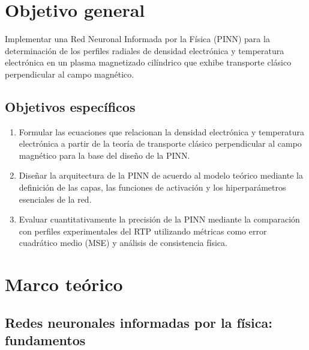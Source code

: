 \section{Objetivo general}
Implementar una Red Neuronal Informada por la Física (PINN) para la determinación de los perfiles radiales de densidad electrónica y temperatura electrónica en un plasma magnetizado cilíndrico que exhibe transporte clásico perpendicular al campo magnético.
\vspace{- 4 mm}
\subsection*{Objetivos específicos}
\vspace{- 4 mm}
\begin{enumerate}[noitemsep]
			\item Formular las ecuaciones que relacionan la densidad electrónica y temperatura electrónica a partir de la teoría de transporte clásico perpendicular al campo magnético para la base del diseño de la PINN.
			\item Diseñar la arquitectura de la PINN de acuerdo al modelo teórico mediante la definición de las capas, las funciones de activación y los hiperparámetros esenciales de la red. 
			\item  Evaluar cuantitativamente la precisión de la PINN mediante la comparación con perfiles experimentales del RTP utilizando métricas como error cuadrático medio (MSE) y análisis de consistencia física.
		\end{enumerate}
\vspace{-4 mm}
\section{Marco teórico}

\subsection{Redes neuronales informadas por la física: fundamentos}

